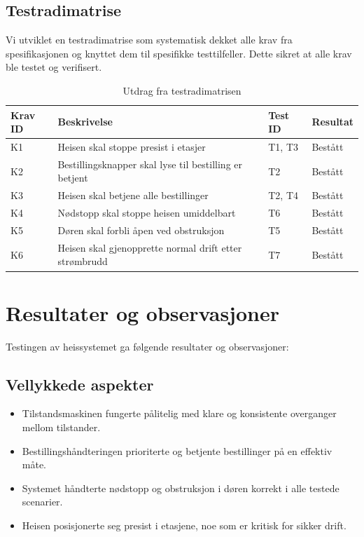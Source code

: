 \subsection{Testradimatrise}
Vi utviklet en testradimatrise som systematisk dekket alle krav fra spesifikasjonen og knyttet dem til spesifikke testtilfeller. Dette sikret at alle krav ble testet og verifisert.

\begin{table}[h]
\centering
\begin{tabular}{|l|l|l|l|}
\hline
\textbf{Krav ID} & \textbf{Beskrivelse} & \textbf{Test ID} & \textbf{Resultat} \\
\hline
K1 & Heisen skal stoppe presist i etasjer & T1, T3 & Bestått \\
\hline
K2 & Bestillingsknapper skal lyse til bestilling er betjent & T2 & Bestått \\
\hline
K3 & Heisen skal betjene alle bestillinger & T2, T4 & Bestått \\
\hline
K4 & Nødstopp skal stoppe heisen umiddelbart & T6 & Bestått \\
\hline
K5 & Døren skal forbli åpen ved obstruksjon & T5 & Bestått \\
\hline
K6 & Heisen skal gjenopprette normal drift etter strømbrudd & T7 & Bestått \\
\hline
\end{tabular}
\caption{Utdrag fra testradimatrisen}
\label{tab:testradimatrix}
\end{table}

\section{Resultater og observasjoner}
Testingen av heissystemet ga følgende resultater og observasjoner:

\subsection{Vellykkede aspekter}
\begin{itemize}
    \item Tilstandsmaskinen fungerte pålitelig med klare og konsistente overganger mellom tilstander.
    \item Bestillingshåndteringen prioriterte og betjente bestillinger på en effektiv måte.
    \item Systemet håndterte nødstopp og obstruksjon i døren korrekt i alle testede scenarier.
    \item Heisen posisjonerte seg presist i etasjene, noe som er kritisk for sikker drift.
\end{itemize}

